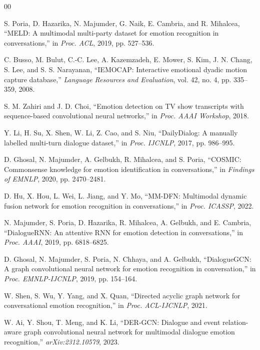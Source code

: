 \documentclass{ieeeaccess}
\begin{document}
\begin{thebibliography}{00}

 S. Poria, D. Hazarika, N. Majumder, G. Naik, E. Cambria, and R. Mihalcea,
``MELD: A multimodal multi-party dataset for emotion recognition in conversations,'' in
\emph{Proc. ACL}, 2019, pp. 527--536.

 C. Busso, M. Bulut, C.-C. Lee, A. Kazemzadeh, E. Mower, S. Kim, J. N.
Chang, S. Lee, and S. S. Narayanan, ``IEMOCAP: Interactive emotional dyadic motion capture
database,'' \emph{Language Resources and Evaluation}, vol. 42, no. 4, pp. 335--359, 2008.

 S. M. Zahiri and J. D. Choi, ``Emotion detection on TV show
transcripts with sequence-based convolutional neural networks,'' in \emph{Proc. AAAI Workshop},
2018.

 Y. Li, H. Su, X. Shen, W. Li, Z. Cao, and S. Niu, ``DailyDialog: A
manually labelled multi-turn dialogue dataset,'' in \emph{Proc. IJCNLP}, 2017, pp. 986--995.

 D. Ghosal, N. Majumder, A. Gelbukh, R. Mihalcea, and S. Poria, ``COSMIC:
Commonsense knowledge for emotion identification in conversations,'' in \emph{Findings of EMNLP},
2020, pp. 2470--2481.

 D. Hu, X. Hou, L. Wei, L. Jiang, and Y. Mo, ``MM-DFN: Multimodal dynamic
fusion network for emotion recognition in conversations,'' in \emph{Proc. ICASSP}, 2022.

 N. Majumder, S. Poria, D. Hazarika, R. Mihalcea, A. Gelbukh, and
E. Cambria, ``DialogueRNN: An attentive RNN for emotion detection in conversations,'' in
\emph{Proc. AAAI}, 2019, pp. 6818--6825.

 D. Ghosal, N. Majumder, S. Poria, N. Chhaya, and A. Gelbukh,
``DialogueGCN: A graph convolutional neural network for emotion recognition in conversation,'' in
\emph{Proc. EMNLP-IJCNLP}, 2019, pp. 154--164.

 W. Shen, S. Wu, Y. Yang, and X. Quan, ``Directed acyclic graph network for
conversational emotion recognition,'' in \emph{Proc. ACL-IJCNLP}, 2021.

 W. Ai, Y. Shou, T. Meng, and K. Li, ``DER-GCN: Dialogue and event
relation-aware graph convolutional neural network for multimodal dialogue emotion recognition,''
\emph{arXiv:2312.10579}, 2023.


\end{thebibliography}
\end{document}
